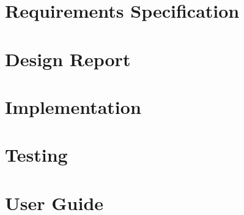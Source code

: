 \documentclass[preprint,11pt,review,authoryear]{elsarticle}
\begin{document}
\section{Requirements Specification}
\renewcommand{\thepage}{E\arabic{page}}
\newpage
\section{Design Report}
\renewcommand{\thepage}{F\arabic{page}}
\newpage
\section{Implementation}
\renewcommand{\thepage}{G\arabic{page}}
\newpage
\section{Testing}
\renewcommand{\thepage}{H\arabic{page}}
\newpage
\section{User Guide}
\renewcommand{\thepage}{I\arabic{page}}
\newpage
\end{document}
